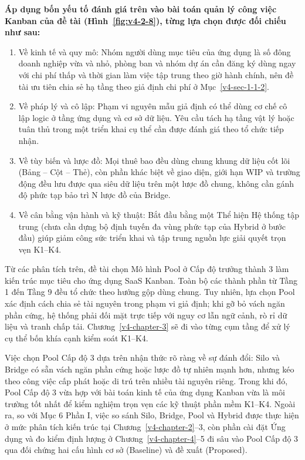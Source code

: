 \textbf{Áp dụng bốn yếu tố đánh giá trên vào bài toán quản lý công việc Kanban của đề tài (Hình~\ref{fig:v4-2-8}), từng lựa chọn được đối chiếu như sau:}

\begin{enumerate}
\def\labelenumi{\arabic{enumi}.}
\item
  Về kinh tế và quy mô: Nhóm người dùng mục tiêu của ứng dụng là số đông doanh nghiệp vừa và nhỏ, phòng ban và nhóm dự án cần đăng ký dùng ngay với chi phí thấp và thời gian làm việc tập trung theo giờ hành chính, nên đề tài ưu tiên chia sẻ hạ tầng theo giả định chi phí ở Mục~\ref{v4-sec-1-1-2}.
\item
  Về pháp lý và cô lập: Phạm vi nguyên mẫu giả định có thể dùng cơ chế cô lập logic ở tầng ứng dụng và cơ sở dữ liệu. Yêu cầu tách hạ tầng vật lý hoặc tuân thủ trong một triển khai cụ thể cần được đánh giá theo tổ chức tiếp nhận.
\item
  Về tùy biến và lược đồ: Mọi thuê bao đều dùng chung khung dữ liệu cốt lõi (Bảng -- Cột -- Thẻ), còn phần khác biệt về giao diện, giới hạn WIP và trường động đều lưu được qua siêu dữ liệu trên một lược đồ chung, không cần gánh độ phức tạp bảo trì N lược đồ của Bridge.
\item
  Về cân bằng vận hành và kỹ thuật: Bắt đầu bằng một Thể hiện Hệ thống tập trung (chưa cần dựng bộ định tuyến đa vùng phức tạp của Hybrid ở bước đầu) giúp giảm công sức triển khai và tập trung nguồn lực giải quyết trọn vẹn K1--K4.
\end{enumerate}


Từ các phân tích trên, đề tài chọn Mô hình Pool ở Cấp độ trưởng thành 3 làm kiến trúc mục tiêu cho ứng dụng SaaS Kanban. Toàn bộ các thành phần từ Tầng 1 đến Tầng 9 đều tổ chức theo hướng gộp dùng chung. Tuy nhiên, lựa chọn Pool xác định cách chia sẻ tài nguyên trong phạm vi giả định; khi gỡ bỏ vách ngăn phần cứng, hệ thống phải đối mặt trực tiếp với nguy cơ lẫn ngữ cảnh, rò rỉ dữ liệu và tranh chấp tải. Chương~\ref{v4-chapter-3} sẽ đi vào từng cụm tầng để xử lý cụ thể bốn khía cạnh kiểm soát K1--K4.

Việc chọn Pool Cấp độ 3 dựa trên nhận thức rõ ràng về sự đánh đổi: Silo và Bridge có sẵn vách ngăn phần cứng hoặc lược đồ tự nhiên mạnh hơn, nhưng kéo theo công việc cấp phát hoặc di trú trên nhiều tài nguyên riêng. Trong khi đó, Pool Cấp độ 3 vừa hợp với bài toán kinh tế của ứng dụng Kanban vừa là môi trường tốt nhất để kiểm nghiệm trọn vẹn các kỹ thuật phần mềm K1--K4. Ngoài ra, so với Mục 6 Phần I, việc so sánh Silo, Bridge, Pool và Hybrid được thực hiện ở mức phân tích kiến trúc tại Chương~\ref{v4-chapter-2}--3, còn phần cài đặt Ứng dụng và đo kiểm định lượng ở Chương~\ref{v4-chapter-4}--5 đi sâu vào Pool Cấp độ 3 qua đối chứng hai cấu hình cơ sở (Baseline) và đề xuất (Proposed).
